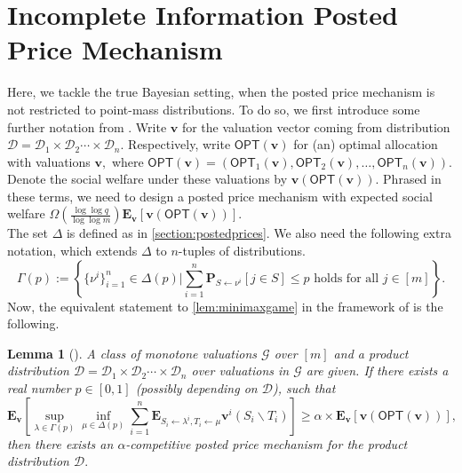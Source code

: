 \documentclass[11pt]{article}%
\newtheorem{lemma}[theorem]{Lemma}
\numberwithin{theorem}{subsection}
\newcommand{\prob}{\mathbf{P}}
\newcommand{\boldv}{\mathbf{v}}
\newcommand{\opt}{\mathsf{OPT}}
\newcommand{\expect}{\mathbf{E}}
\begin{document}
\section{Incomplete Information Posted Price Mechanism}\label{sec:incompleteposted}
Here, we tackle the true Bayesian setting, when the posted price mechanism is not restricted to point-mass distributions. To do so, we first introduce some further notation from \cite{DuttingKL20}. Write $\boldv$ for the valuation vector coming from distribution $\mathcal{D} = \mathcal{D}_1\times \mathcal{D}_2\cdots\times\mathcal{D}_n.$ Respectively, write $\opt(\boldv)$ for (an) optimal allocation with valuations $\boldv,$ where $\opt(\boldv) =  (\opt_1(\boldv),\opt_2(\boldv),\ldots, \opt_n(\boldv)).$ Denote the social welfare under these valuations by $\boldv(\opt(\boldv)).$ Phrased in these terms, we need to design a posted price mechanism with expected social welfare $\Omega\left(\frac{\log \log q}{\log \log m}\right)\expect_\boldv[\boldv(\opt(\boldv))].$\\

\noindent
The set $\Delta$ is defined as in \cref{section:postedprices}. We also need the following extra notation, which extends $\Delta$ to $n$-tuples of distributions.
$$
\Gamma(p):=
\left\{\{\nu^i\}_{i=1}^n \in \Delta(p)| \sum_{i=1}^n 
\prob_{S\longleftarrow \nu^i}[j \in S]\le p \text{ holds for all }j \in [m]\right\}.
$$
Now, the equivalent statement to 
\cref{lem:minimaxgame} in the framework of 
\cite{DuttingKL20}
is the following.

\begin{lemma}[{\cite[p.268]{DuttingKL20}}]
\label{lem:minimaxgamebayes}
A class of monotone valuations $\mathcal{G}$ over $[m]$ and a product distribution 
$\mathcal{D} = \mathcal{D}_1\times \mathcal{D}_2\cdots\times\mathcal{D}_n$ over valuations in $\mathcal{G}$ are given.
If there exists a real number $p \in [0,1]$ (possibly depending on $\mathcal{D}$), such that 
$$
\expect_{\boldv}\left[
\sup_{\lambda \in \Gamma(p)}
\inf_{\mu \in \Delta(p)}
\sum_{i = 1}^n 
\expect_{S_i\longleftarrow \lambda^i, T_i \longleftarrow \mu}\boldv^i(S_i\backslash T_i)
\right]\ge 
\alpha\times \expect_\boldv[\boldv(\opt(\boldv))],
$$
then there exists an $\alpha$-competitive posted price mechanism for the product distribution $\mathcal{D}.$
\end{lemma}
\end{document}
